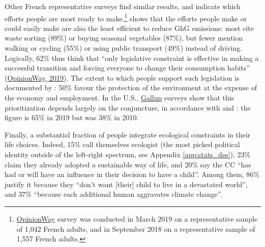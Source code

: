 \documentclass[english,5p,authoryear]{elsarticle}
\begin{document}
Other French representative surveys find similar results, and indicate which efforts people are most ready to make.\footnote{\hyperlink{http://www.datapressepremium.com/rmdiff/2008572/Etude-OpinionWay-pour-PrimesEnergie.fr.pdf}{OpinionWay} survey was conducted in March 2019 on a representative sample of 1,042 French adults, and \citet{ademe_representations_2018} in September 2018 on a representative sample of 1,557 French adults.} 
\citet{ademe_representations_2018} shows that the efforts people make or could easily make are also the least efficient to reduce GhG emissions: most cite waste sorting (89\%) or buying seasonal vegetables (87\%), but fewer mention walking or cycling (55\%) or using public transport (49\%) instead of driving. Logically, 62\% thus think that ``only legislative constraint is effective in making a successful transition and forcing everyone to change their consumption habits'' (\hyperlink{http://www.datapressepremium.com/rmdiff/2008572/Etude-OpinionWay-pour-PrimesEnergie.fr.pdf}{OpinionWay, 2019}). The extent to which people support such legislation is documented by \citet{brechon_france_2019}: 50\% favour the protection of the environment at the expense of the economy and employment. In the U.S., \hyperlink{https://news.gallup.com/poll/1615/environment.aspx}{Gallup} surveys show that this prioritization depends largely on the conjuncture, in accordance with \citet{brulle_shifting_2012} and \citet{shum_effects_2012}: the figure is 65\% in 2019 but was 38\% in 2010.

Finally, a substantial fraction of people integrate ecological constraints in their life choices. Indeed, 15\% call themselves ecologist (the most picked political identity outside of the left-right spectrum, see Appendix \ref{app:stats_des}), 23\% claim they already adopted a sustainable way of life, and 20\% say the CC ``has had or will have an influence in their decision to have a child''. Among them, 86\% justify it because they ``don't want [their] child to live in a devastated world'', and 37\% ``because each additional human aggravates climate change''.
\end{document}
